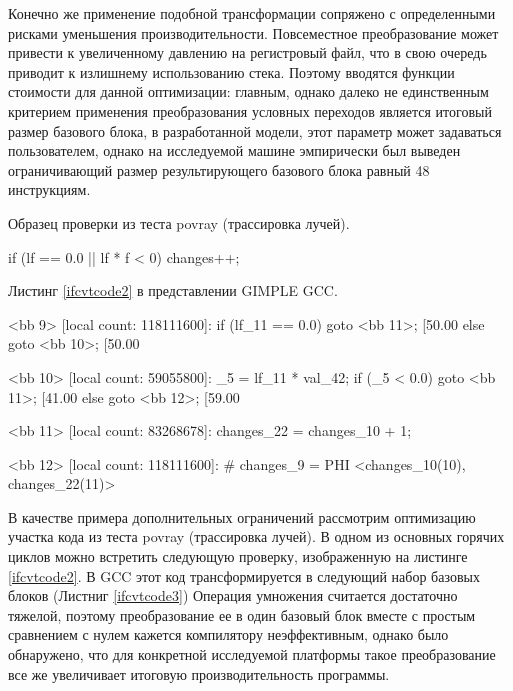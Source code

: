 Конечно же применение подобной трансформации сопряжено с определенными рисками уменьшения производительности. Повсеместное преобразование может привести к увеличенному давлению на регистровый файл, что в свою очередь приводит к излишнему использованию стека. Поэтому вводятся функции стоимости для данной оптимизации: главным, однако далеко не единственным критерием применения преобразования условных переходов является итоговый размер базового блока, в  разработанной модели, этот параметр может задаваться пользователем, однако на исследуемой машине эмпирически был выведен  ограничивающий размер  результирующего базового блока равный 48 инструкциям.
\begin{ListingEnv}[!h]
	\captiondelim{ } %
	\caption{Образец проверки из теста povray (трассировка лучей).}
	\label{ifcvtcode2}
	\begin{Verb}
		if (lf == 0.0 || lf * f < 0)
		{
			changes++;
		} 
	\end{Verb}
\end{ListingEnv}


\begin{ListingEnv}[!h]
	\captiondelim{ } %
	\caption{Листинг \ref{ifcvtcode2} в представлении GIMPLE GCC.}
	\label{ifcvtcode3}
	\begin{Verb}
		<bb 9> [local count: 118111600]:
		if (lf_11 == 0.0)
		goto <bb 11>; [50.00%
		else
		goto <bb 10>; [50.00%
		
		<bb 10> [local count: 59055800]:
		_5 = lf_11 * val_42;
		if (_5 < 0.0)
		goto <bb 11>; [41.00%
		else
		goto <bb 12>; [59.00%
		
		<bb 11> [local count: 83268678]:
		changes_22 = changes_10 + 1;
		
		<bb 12> [local count: 118111600]:
		# changes_9 = PHI <changes_10(10), changes_22(11)>
	\end{Verb}
\end{ListingEnv}
В качестве примера дополнительных ограничений рассмотрим оптимизацию участка кода из теста povray (трассировка лучей). В одном из основных горячих циклов можно встретить следующую проверку, изображенную на листинге \ref{ifcvtcode2}. В GCC этот код трансформируется в следующий набор базовых блоков (Листниг \ref{ifcvtcode3}) Операция умножения считается достаточно тяжелой, поэтому преобразование ее в  один базовый блок вместе с простым сравнением с нулем кажется компилятору неэффективным, однако было обнаружено, что для конкретной исследуемой платформы такое преобразование все же увеличивает итоговую производительность программы.  



